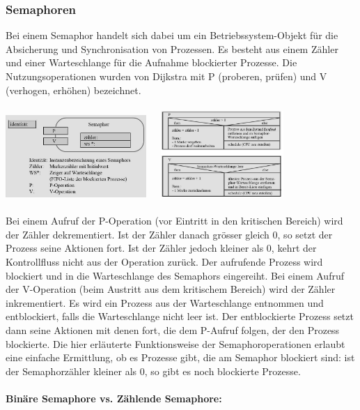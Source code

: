 \subsubsection{Semaphoren}
Bei einem Semaphor handelt sich dabei um ein Betriebssystem-Objekt für die Absicherung und Synchronisation von Prozessen. Es besteht aus einem Zähler und einer Warteschlange für die Aufnahme blockierter Prozesse. Die Nutzungsoperationen wurden von Dijkstra mit P (proberen, prüfen) und V (verhogen, erhöhen) bezeichnet.\\ \\
\includegraphics[width=0.4\textwidth]{images/Betriebssysteme/Semaphor.png}\ \ \
\includegraphics[width=0.35\textwidth]{images/Betriebssysteme/PVOperation.png}\\\\
Bei einem Aufruf der P-Operation (vor Eintritt in den kritischen Bereich) wird der Zähler dekrementiert. Ist der Zähler danach grösser gleich 0, so setzt der Prozess seine Aktionen fort. Ist der Zähler jedoch kleiner als 0, kehrt der Kontrollfluss nicht aus der Operation zurück. Der aufrufende Prozess wird blockiert und in die Warteschlange des Semaphors eingereiht. Bei einem Aufruf der V-Operation (beim Austritt aus dem kritischem Bereich) wird der Zähler inkrementiert. Es wird ein Prozess aus der Warteschlange entnommen und entblockiert, falls die Warteschlange nicht leer ist. Der entblockierte Prozess setzt dann seine Aktionen mit denen fort, die dem P-Aufruf folgen, der den Prozess blockierte. Die hier erläuterte Funktionsweise der Semaphoroperationen erlaubt eine einfache Ermittlung, ob es Prozesse gibt, die am Semaphor blockiert sind: ist der Semaphorzähler kleiner als 0, so gibt es noch blockierte Prozesse.\\\\
\textbf{Binäre Semaphore vs. Zählende Semaphore:}
